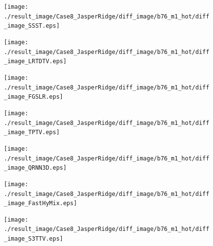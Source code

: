 \begin{figure}[t]
\begin{center}
		\begin{minipage}{0.125\hsize}
			\centerline{\texttt{[image: ./result\_image/Case8\_JasperRidge/diff\_image/b76\_m1\_hot/diff\_image\_SSST.eps]}} %
		\end{minipage}
		\begin{minipage}{0.125\hsize}
			\centerline{\texttt{[image: ./result\_image/Case8\_JasperRidge/diff\_image/b76\_m1\_hot/diff\_image\_LRTDTV.eps]}} %
		\end{minipage}
		\begin{minipage}{0.125\hsize}
			\centerline{\texttt{[image: ./result\_image/Case8\_JasperRidge/diff\_image/b76\_m1\_hot/diff\_image\_FGSLR.eps]}} %
		\end{minipage}
		\begin{minipage}{0.125\hsize}
			\centerline{\texttt{[image: ./result\_image/Case8\_JasperRidge/diff\_image/b76\_m1\_hot/diff\_image\_TPTV.eps]}} %
		\end{minipage}
		\begin{minipage}{0.125\hsize}
			\centerline{\texttt{[image: ./result\_image/Case8\_JasperRidge/diff\_image/b76\_m1\_hot/diff\_image\_QRNN3D.eps]}} %
		\end{minipage}
		\begin{minipage}{0.125\hsize}
			\centerline{\texttt{[image: ./result\_image/Case8\_JasperRidge/diff\_image/b76\_m1\_hot/diff\_image\_FastHyMix.eps]}} %
		\end{minipage}
		\begin{minipage}{0.125\hsize}
			\centerline{\texttt{[image: ./result\_image/Case8\_JasperRidge/diff\_image/b76\_m1\_hot/diff\_image\_S3TTV.eps]}} %
		\end{minipage}
		\begin{minipage}{0.050\hsize}

\end{minipage}
\end{center}
\end{figure}
